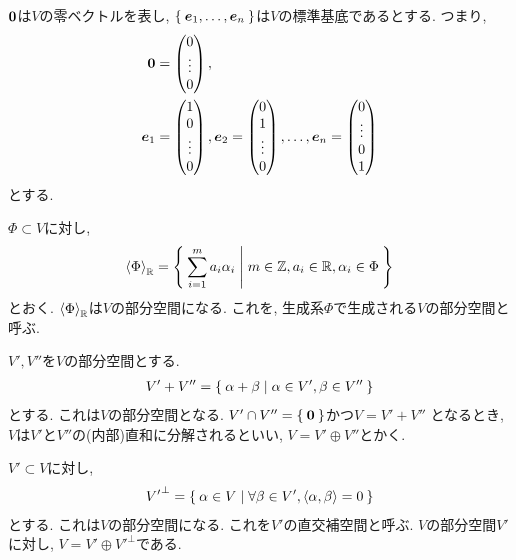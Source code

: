 $\boldsymbol{0}$は$V$の零ベクトルを表し,
$\Set{\boldsymbol{e}_1,\ldots,\boldsymbol{e}_n}$は$V$の標準基底であるとする.
つまり,
\begin{align*}
 \boldsymbol{0}&=\begin{pmatrix}0\\\vdots\\0\end{pmatrix},\\
 \boldsymbol{e}_1&=\begin{pmatrix}1\\0\\\vdots\\0\end{pmatrix},
 \boldsymbol{e}_2=\begin{pmatrix}0\\1\\\vdots\\0\end{pmatrix},
 \ldots,
 \boldsymbol{e}_n=\begin{pmatrix}0\\\vdots\\0\\1\end{pmatrix}
\end{align*}
とする.

$\Phi\subset V$に対し,
\begin{align*}
\Braket{\Phi}_{\mathbb{R}}=\Set{\sum_{i=1}^{m}a_{i}\alpha_i|m\in\mathbb{Z},a_i\in \mathbb{R},\alpha_i\in \Phi}
\end{align*}
とおく.
$\Braket{\Phi}_{\mathbb{R}}$は$V$の部分空間になる.
これを, 生成系$\Phi$で生成される$V$の部分空間と呼ぶ.

$V',V''$を$V$の部分空間とする.
\begin{align*}
  V'+V''=\Set{\alpha+\beta|
    \alpha\in V', \beta\in V''}
\end{align*}
とする. これは$V$の部分空間となる.
$V'\cap V''=\Set{\boldsymbol{0}}$かつ$V=V'+V''$
となるとき,
$V$は$V'$と$V''$の(内部)直和に分解されるといい,
$V=V'\oplus V''$とかく.

$V'\subset V$に対し,
\begin{align*}
  {V'}^\perp=\Set{\alpha\in V| \forall \beta\in V',\Braket{\alpha,\beta}=0}
\end{align*}
とする. これは$V$の部分空間になる.
これを$V'$の直交補空間と呼ぶ.
$V$の部分空間$V'$に対し,
$V=V'\oplus {V'}^\perp$である.

